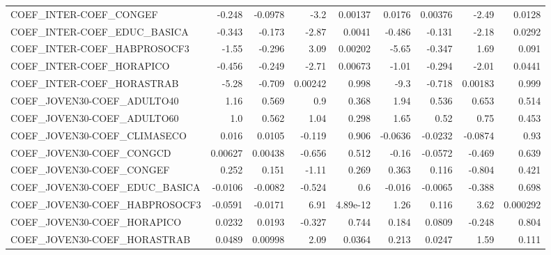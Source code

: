 \begin{tabular}{lrrrrrrrr}
COEF\_INTER-COEF\_CONGEF              &      -0.248 &      -0.0978 &    -3.2 &  0.00137 &     0.0176 &     0.00376 &        -2.49 &        0.0128 \\
COEF\_INTER-COEF\_EDUC\_BASICA         &      -0.343 &       -0.173 &   -2.87 &   0.0041 &     -0.486 &      -0.131 &        -2.18 &        0.0292 \\
COEF\_INTER-COEF\_HABPROSOCF3         &       -1.55 &       -0.296 &    3.09 &  0.00202 &      -5.65 &      -0.347 &         1.69 &         0.091 \\
COEF\_INTER-COEF\_HORAPICO            &      -0.456 &       -0.249 &   -2.71 &  0.00673 &      -1.01 &      -0.294 &        -2.01 &        0.0441 \\
COEF\_INTER-COEF\_HORASTRAB           &       -5.28 &       -0.709 & 0.00242 &    0.998 &       -9.3 &      -0.718 &      0.00183 &         0.999 \\
COEF\_JOVEN30-COEF\_ADULTO40          &        1.16 &        0.569 &     0.9 &    0.368 &       1.94 &       0.536 &        0.653 &         0.514 \\
COEF\_JOVEN30-COEF\_ADULTO60          &         1.0 &        0.562 &    1.04 &    0.298 &       1.65 &        0.52 &         0.75 &         0.453 \\
COEF\_JOVEN30-COEF\_CLIMASECO         &       0.016 &       0.0105 &  -0.119 &    0.906 &    -0.0636 &     -0.0232 &      -0.0874 &          0.93 \\
COEF\_JOVEN30-COEF\_CONGCD            &     0.00627 &      0.00438 &  -0.656 &    0.512 &      -0.16 &     -0.0572 &       -0.469 &         0.639 \\
COEF\_JOVEN30-COEF\_CONGEF            &       0.252 &        0.151 &   -1.11 &    0.269 &      0.363 &       0.116 &       -0.804 &         0.421 \\
COEF\_JOVEN30-COEF\_EDUC\_BASICA       &     -0.0106 &      -0.0082 &  -0.524 &      0.6 &     -0.016 &     -0.0065 &       -0.388 &         0.698 \\
COEF\_JOVEN30-COEF\_HABPROSOCF3       &     -0.0591 &      -0.0171 &    6.91 & 4.89e-12 &       1.26 &       0.116 &         3.62 &      0.000292 \\
COEF\_JOVEN30-COEF\_HORAPICO          &      0.0232 &       0.0193 &  -0.327 &    0.744 &      0.184 &      0.0809 &       -0.248 &         0.804 \\
COEF\_JOVEN30-COEF\_HORASTRAB         &      0.0489 &      0.00998 &    2.09 &   0.0364 &      0.213 &      0.0247 &         1.59 &         0.111 \\

\end{tabular}
